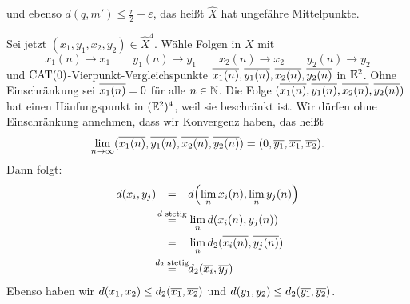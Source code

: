 \begin{beweis}
	und ebenso $d(q,m') \leq \frac{r}{2} + \varepsilon$, das heißt $\widehat{X}$ hat ungefähre Mittelpunkte.
	
	Sei jetzt $(x_1,y_1,x_2,y_2) \in \widehat{X}^4$. Wähle Folgen in $X$ mit
	\[
		x_1(n) \rightarrow x_1 \qquad y_1(n) \rightarrow y_1 \qquad x_2(n) \rightarrow x_2 \qquad y_2(n) \rightarrow y_2
	\]
	und $\operatorname{CAT(0)}$-Vierpunkt-Vergleichspunkte $\overline{x_1(n)}, \overline{y_1(n)}, \overline{x_2(n)}, \overline{y_2(n)}$ in $\mathbb{E}^2$. Ohne Einschränkung sei $\overline{x_1(n)} = 0$ für alle $n \in \mathbb{N}$. Die Folge $(\overline{x_1(n)}, \overline{y_1(n)}, \overline{x_2(n)}, \overline{y_2(n)})$ hat einen Häufungspunkt in $(\mathbb{E}^2)^4$, weil sie beschränkt ist. Wir dürfen ohne Einschränkung annehmen, dass wir Konvergenz haben, das heißt
	\[
		\lim\limits_{n \rightarrow \infty} (\overline{x_1(n)}, \overline{y_1(n)}, \overline{x_2(n)}, \overline{y_2(n)}) = (0,\overline{y_1},\overline{x_1},\overline{x_2}).
	\]
	Dann folgt:
	\begin{align*}
		d(x_i,y_j) &\stack{}{=} d\enbrace*{\lim\limits_{n} x_i(n), \lim\limits_n y_j(n)} \\
		&\stack{d\text{ stetig}}{=} \lim\limits_{n} d(x_i(n),y_j(n)) \\
		&\stack{}{=} \lim\limits_{n} d_2(\ol{x_i(n)},\ol{y_j(n)}) \\
		&\stack{d_2\text{ stetig}}{=} d_2(\ol{x_i},\ol{y_j})
	\end{align*}
	Ebenso haben wir $d(x_1,x_2) \leq d_2(\overline{x_1},\overline{x_2})$ und $d(y_1,y_2) \leq d_2(\overline{y_1},\overline{y_2})$. 
\end{beweis}
\cleardoubleemptypage